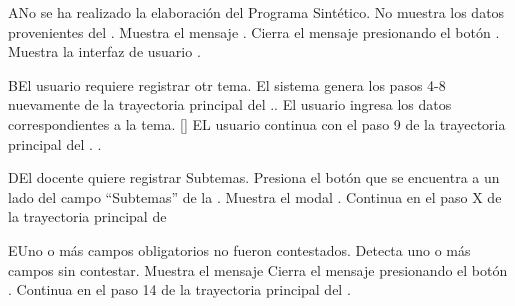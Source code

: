 
\begin{UCtrayectoriaA}{A}{No se ha realizado la elaboración del Programa Sintético}.
	\UCpaso No muestra los datos provenientes del .
	\UCpaso Muestra el mensaje .
	\UCpaso[\UCactor] Cierra el mensaje presionando el botón .
	\UCpaso Muestra la interfaz de usuario .
\end{UCtrayectoriaA}



\begin{UCtrayectoriaA}{B}{El usuario requiere registrar otr tema}.
	\UCpaso El sistema genera los pasos 4-8 nuevamente de la trayectoria principal del ..
    \UCpaso[\UCactor] El usuario ingresa los datos correspondientes a la tema.
    \UCpaso{}[\UCactor] EL usuario continua con el paso 9 de la trayectoria principal del .
    .
\end{UCtrayectoriaA}


\begin{UCtrayectoriaA}{D}{El docente quiere registrar Subtemas}.
	\UCpaso[\UCactor] Presiona el botón \BtnModal que se encuentra a un lado del campo ``Subtemas'' de la .
	\UCpaso Muestra el modal .
	\UCpaso Continua en el paso X de la trayectoria principal de 
\end{UCtrayectoriaA}


\begin{UCtrayectoriaA}{E}{Uno o más campos obligatorios no fueron contestados.}
	\UCpaso Detecta uno o más campos sin contestar.
    \UCpaso Muestra el mensaje 
    \UCpaso[\UCactor] Cierra el mensaje presionando el botón .
    \UCpaso Continua en el paso 14 de la trayectoria principal del .
\end{UCtrayectoriaA}
